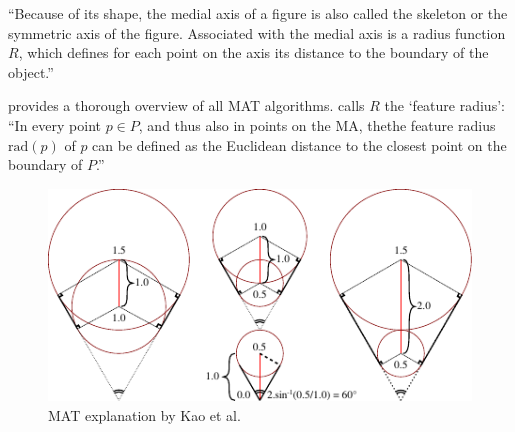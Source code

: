 ``Because of its shape, the medial axis of a figure is also called the skeleton or the symmetric axis of the figure.
Associated with the medial axis is a radius function $R$, which defines for each point on the axis its distance to the boundary of the object.''
\cite{lee1982medial}

\cite{Moesen2011} provides a thorough overview of all MAT algorithms.
\cite{Moesen2011} calls $R$ the `feature radius': ``In every point $p \in P$, and thus also in points on the MA, thethe feature radius $\text{rad}(p)$ of $p$ can be defined as the Euclidean distance to the closest point on the boundary of $P$.''

\cite{kao1998optimal}
\begin{figure}[H]
\centering
\includegraphics[width=.9\columnwidth]{sources/method/distance_based_angles.pdf}
\caption{MAT explanation by Kao et al.}
\end{figure}



